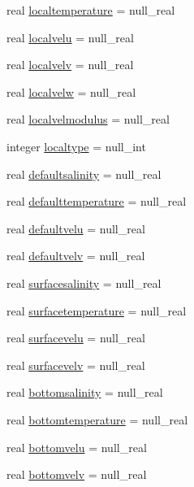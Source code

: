 \begin{DoxyCompactItemize}
real \mbox{\hyperlink{structmodulejet_1_1t__ambient_a14c1ea02d36030e128d3f7c798357417}{localtemperature}} = null\+\_\+real
\item 
real \mbox{\hyperlink{structmodulejet_1_1t__ambient_a312d067e8dccb2e18eae44d20e9d8355}{localvelu}} = null\+\_\+real
\item 
real \mbox{\hyperlink{structmodulejet_1_1t__ambient_ad9531c92f3dc32d7860f3a8621574b4f}{localvelv}} = null\+\_\+real
\item 
real \mbox{\hyperlink{structmodulejet_1_1t__ambient_a5cdf42ffc46834cfd63282d3d9931f62}{localvelw}} = null\+\_\+real
\item 
real \mbox{\hyperlink{structmodulejet_1_1t__ambient_adb6e3b9f8998a44d23f9e548378d508b}{localvelmodulus}} = null\+\_\+real
\item 
integer \mbox{\hyperlink{structmodulejet_1_1t__ambient_a876cf9b10033c521330674482e3c18a1}{localtype}} = null\+\_\+int
\item 
real \mbox{\hyperlink{structmodulejet_1_1t__ambient_a5570a0993d292436ec027f3b7dc23ed7}{defaultsalinity}} = null\+\_\+real
\item 
real \mbox{\hyperlink{structmodulejet_1_1t__ambient_a04ff29a254edd5d9573a25354307b8fe}{defaulttemperature}} = null\+\_\+real
\item 
real \mbox{\hyperlink{structmodulejet_1_1t__ambient_a5d146136de53b56f047af515eb43a1a8}{defaultvelu}} = null\+\_\+real
\item 
real \mbox{\hyperlink{structmodulejet_1_1t__ambient_a5628aeb9368ceb8b4fba0befb645eae9}{defaultvelv}} = null\+\_\+real
\item 
real \mbox{\hyperlink{structmodulejet_1_1t__ambient_aa0d40a5880e5ab7e807818651f3841c2}{surfacesalinity}} = null\+\_\+real
\item 
real \mbox{\hyperlink{structmodulejet_1_1t__ambient_ae99ed23ebc995fae8ce71d61d44e2ccd}{surfacetemperature}} = null\+\_\+real
\item 
real \mbox{\hyperlink{structmodulejet_1_1t__ambient_ab89ed56096091943eb5946e9e41cfa03}{surfacevelu}} = null\+\_\+real
\item 
real \mbox{\hyperlink{structmodulejet_1_1t__ambient_a7bf3777e6ffc870c78e425d70cf85f33}{surfacevelv}} = null\+\_\+real
\item 
real \mbox{\hyperlink{structmodulejet_1_1t__ambient_ac9424de64c04aa2a3afa0f2c47b235f4}{bottomsalinity}} = null\+\_\+real
\item 
real \mbox{\hyperlink{structmodulejet_1_1t__ambient_a563b22ca06715cec02d65bdba4814f19}{bottomtemperature}} = null\+\_\+real
\item 
real \mbox{\hyperlink{structmodulejet_1_1t__ambient_a9a95205b6f29b9bff34af0d2ca72a999}{bottomvelu}} = null\+\_\+real
\item 
real \mbox{\hyperlink{structmodulejet_1_1t__ambient_ab118cc4004c3e00890c4c2f386d02af0}{bottomvelv}} = null\+\_\+real
\end{DoxyCompactItemize}


